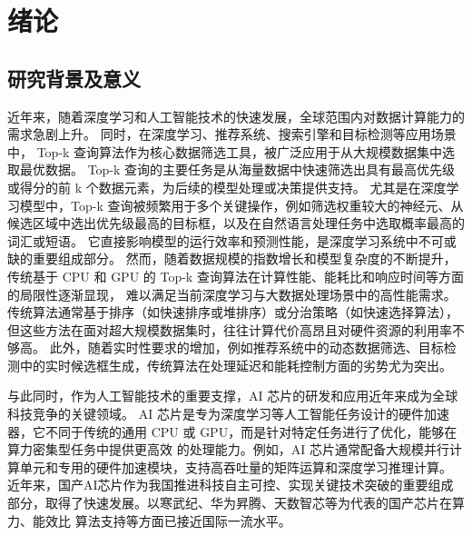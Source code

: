 \chapter{绪论}
\section{研究背景及意义}
近年来，随着深度学习和人工智能技术的快速发展，全球范围内对数据计算能力的需求急剧上升\cite{devlin2019bert}\cite{vaswani2017attention}。
同时，在深度学习\cite{vaswani2017attention}、推荐系统\cite{han2022vision}、搜索引擎\cite{wangningmapreduce}和目标检测\cite{krizhevsky2012imagenet}等应用场景中，
Top-k 查询算法作为核心数据筛选工具，被广泛应用于从大规模数据集中选取最优数据\cite{韩希先2010tkep}\cite{JSJA202405009}。
Top-k 查询的主要任务是从海量数据中快速筛选出具有最高优先级或得分的前 k 个数据元素，为后续的模型处理或决策提供支持。
尤其是在深度学习模型中，Top-k 查询被频繁用于多个关键操作，例如筛选权重较大的神经元、从候选区域中选出优先级最高的目标框，以及在自然语言处理任务中选取概率最高的词汇或短语。
它直接影响模型的运行效率和预测性能，是深度学习系统中不可或缺的重要组成部分。\cite{zeng2024turn}
然而，随着数据规模的指数增长和模型复杂度的不断提升，传统基于 CPU 和 GPU 的 Top-k 查询算法在计算性能、能耗比和响应时间等方面的局限性逐渐显现，
难以满足当前深度学习与大数据处理场景中的高性能需求\cite{sgherzi2022mixed}。
传统算法通常基于排序（如快速排序或堆排序）或分治策略（如快速选择算法），但这些方法在面对超大规模数据集时，往往计算代价高昂且对硬件资源的利用率不够高。
此外，随着实时性要求的增加，例如推荐系统中的动态数据筛选、目标检测中的实时候选框生成，传统算法在处理延迟和能耗控制方面的劣势尤为突出。

与此同时，作为人工智能技术的重要支撑，AI 芯片的研发和应用近年来成为全球科技竞争的关键领域。
AI 芯片是专为深度学习等人工智能任务设计的硬件加速器，它不同于传统的通用 CPU 或 GPU，而是针对特定任务进行了优化，能够在算力密集型任务中提供更高效
的处理能力。例如，AI 芯片通常配备大规模并行计算单元和专用的硬件加速模块，支持高吞吐量的矩阵运算和深度学习推理计算。
近年来，国产AI芯片作为我国推进科技自主可控、实现关键技术突破的重要组成部分，取得了快速发展。以寒武纪、华为昇腾、天数智芯等为代表的国产芯片在算力、能效比
算法支持等方面已接近国际一流水平\cite{ZWQY201725011}\cite{GCKX202501012}。


